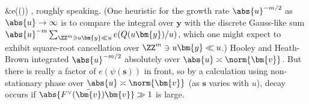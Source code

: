 \documentclass[12pt]{report}
\begin{document}
{{%
&\approx e(\psi())
\cdot{},
}
roughly speaking.
(One heuristic for the growth rate $\abs{u}^{-m/2}$ as $\abs{u}\to \infty$ is to compare the integral over $\bm{y}$ with the discrete Gauss-like sum $\abs{u}^{-m}\sum_{\ZZ^m\ni u\bm{y}\ll u}e(Q(u\bm{y})/u)$, which one might expect to exhibit square-root cancellation over $\ZZ^m\ni u\bm{y}\ll u$.)
Hooley and Heath-Brown integrated $\abs{u}^{-m/2}$ absolutely over $\abs{u}\asymp \norm{\bm{v}}$.
But there is really a factor of
$e(\psi(\bm{s}))$ in front, so by a calculation using non-stationary phase over $\abs{u}\asymp \norm{\bm{v}}$ (as $\bm{s}$ varies with $u$), decay occurs if $\abs{F^\vee(\tilde{\bm{v}})\bm{v}}\gg 1$ is large.
}



\end{document}
